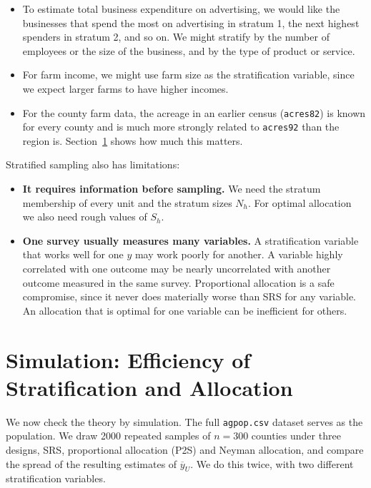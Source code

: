 \documentclass[
  letterpaper,
  DIV=11,
  numbers=noendperiod]{scrreprt}
\providecommand{\tightlist}{%
  \setlength{\itemsep}{0pt}\setlength{\parskip}{0pt}}
\renewcommand{\[}{\begin{equation}}
\renewcommand{\]}{\end{equation}}
\begin{document}
\begin{itemize}
\tightlist
\item
  To estimate total business expenditure on advertising, we would like
  the businesses that spend the most on advertising in stratum 1, the
  next highest spenders in stratum 2, and so on. We might stratify by
  the number of employees or the size of the business, and by the type
  of product or service.
\item
  For farm income, we might use farm size as the stratification
  variable, since we expect larger farms to have higher incomes.
\item
  For the county farm data, the acreage in an earlier census
  (\texttt{acres82}) is known for every county and is much more strongly
  related to \texttt{acres92} than the region is.
  Section~\ref{sec-strata-simulation} shows how much this matters.
\end{itemize}

Stratified sampling also has limitations:

\begin{itemize}
\tightlist
\item
  \textbf{It requires information before sampling.} We need the stratum
  membership of every unit and the stratum sizes \(N_h\). For optimal
  allocation we also need rough values of \(S_h\).
\item
  \textbf{One survey usually measures many variables.} A stratification
  variable that works well for one \(y\) may work poorly for another. A
  variable highly correlated with one outcome may be nearly uncorrelated
  with another outcome measured in the same survey. Proportional
  allocation is a safe compromise, since it never does materially worse
  than SRS for any variable. An allocation that is optimal for one
  variable can be inefficient for others.
\end{itemize}

\section{Simulation: Efficiency of Stratification and
Allocation}\label{sec-strata-simulation}

We now check the theory by simulation. The full \texttt{agpop.csv}
dataset serves as the population. We draw 2000 repeated samples of
\(n = 300\) counties under three designs, SRS, proportional allocation
(P2S) and Neyman allocation, and compare the spread of the resulting
estimates of \(\overline y_U\). We do this twice, with two different
stratification variables.
\end{document}
